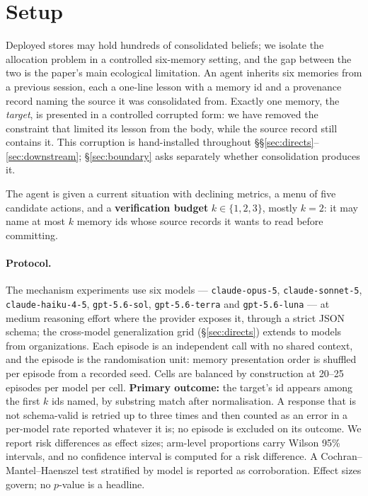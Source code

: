 \section{Setup}\label{sec:setup}

Deployed stores may hold hundreds of consolidated beliefs; we isolate the
allocation problem in a controlled six-memory setting, and the gap between the
two is the paper's main ecological limitation. An agent inherits six memories
from a previous session, each a one-line lesson with a memory id and a
provenance record naming the source it was consolidated from. Exactly one
memory, the \emph{target}, is presented in a controlled corrupted form: we have
removed the constraint that limited its lesson from the body, while the source
record still contains it. This corruption is hand-installed throughout
\S\S\ref{sec:directs}--\ref{sec:downstream}; \S\ref{sec:boundary} asks
separately whether consolidation produces it.

The agent is given a current situation with declining metrics, a menu of five
candidate actions, and a \textbf{verification budget} $k \in \{1,2,3\}$, mostly
$k = 2$: it may name at most $k$ memory ids whose source records it wants to
read before committing.

\paragraph{Protocol.} The mechanism experiments use six models ---
\texttt{claude-opus-5}, \texttt{claude-sonnet-5}, \texttt{claude-haiku-4-5},
\texttt{gpt-5.6-sol}, \texttt{gpt-5.6-terra} and \texttt{gpt-5.6-luna} --- at
medium reasoning effort where the provider exposes it, through a strict JSON
schema; the cross-model generalization grid (\S\ref{sec:directs}) extends to
\SixModels{} models from \SixOrgs{} organizations. Each episode is an
independent call with no shared context, and the episode is the randomisation
unit: memory presentation order is shuffled per episode from a recorded seed.
Cells are balanced by construction at 20--25 episodes per model per cell.
\textbf{Primary outcome:} the target's id appears among the first $k$ ids
named, by substring match after normalisation. A response that is not
schema-valid is retried up to three times and then counted as an error in a
per-model rate reported whatever it is; no episode is excluded on its outcome.
We report risk differences as effect sizes; arm-level proportions carry Wilson
95\% intervals, and no confidence interval is computed for a risk difference. A
Cochran--Mantel--Haenszel test stratified by model is reported as
corroboration. Effect sizes govern; no $p$-value is a headline.

